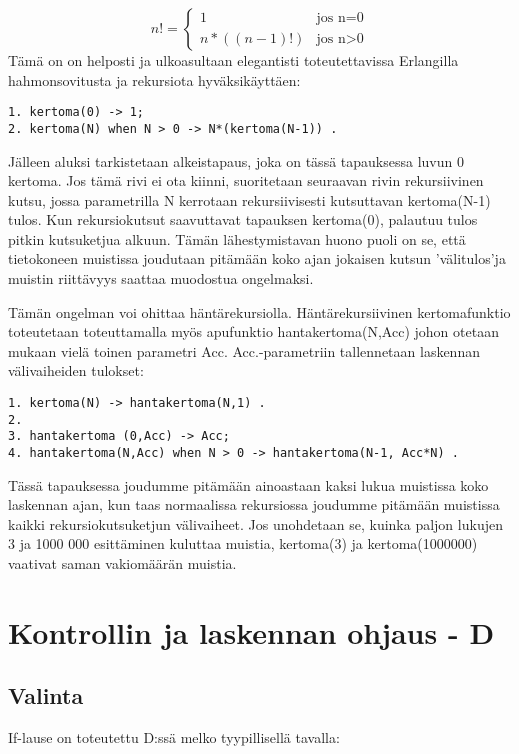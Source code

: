 \documentclass[11pt,oneside,a4paper]{article}
\begin{document}
\begin{displaymath}
n! = \left\{ \begin{array}{ll}
1 & \textrm{jos n=0}\\
n*((n-1)!) & \textrm{{jos n>0}}
\end{array} \right.
\end{displaymath}
Tämä on on helposti ja ulkoasultaan elegantisti toteutettavissa Erlangilla
hahmonsovitusta ja rekursiota hyväksikäyttäen:
\begin{verbatim}
1. kertoma(0) -> 1;
2. kertoma(N) when N > 0 -> N*(kertoma(N-1)) .
\end{verbatim}
Jälleen aluksi tarkistetaan alkeistapaus, joka on tässä tapauksessa luvun 0
kertoma. Jos tämä rivi ei ota kiinni, suoritetaan seuraavan rivin
rekursiivinen kutsu, jossa parametrilla N kerrotaan rekursiivisesti kutsuttavan
kertoma(N-1) tulos.
Kun rekursiokutsut saavuttavat tapauksen kertoma(0), palautuu tulos pitkin
kutsuketjua alkuun. Tämän lähestymistavan huono puoli on se, että tietokoneen
muistissa joudutaan pitämään koko ajan jokaisen kutsun 'välitulos'ja muistin
riittävyys saattaa muodostua ongelmaksi. 

Tämän ongelman voi ohittaa häntärekursiolla. Häntärekursiivinen kertomafunktio
toteutetaan toteuttamalla myös apufunktio hantakertoma(N,Acc) johon otetaan
mukaan vielä toinen parametri Acc. Acc.-parametriin tallennetaan laskennan 
välivaiheiden tulokset:
\begin{verbatim}
1. kertoma(N) -> hantakertoma(N,1) .
2.
3. hantakertoma (0,Acc) -> Acc;
4. hantakertoma(N,Acc) when N > 0 -> hantakertoma(N-1, Acc*N) .
\end{verbatim}
Tässä tapauksessa joudumme pitämään ainoastaan kaksi lukua muistissa koko
laskennan ajan, kun taas normaalissa rekursiossa joudumme pitämään muistissa kaikki
rekursiokutsuketjun välivaiheet. Jos unohdetaan se, kuinka paljon
lukujen 3 ja 1000 000 esittäminen kuluttaa muistia, kertoma(3) ja kertoma(1000000)
vaativat saman vakiomäärän muistia. 

\section{Kontrollin ja laskennan ohjaus - D}

\subsection{Valinta}

If-lause on toteutettu D:ssä melko tyypillisellä tavalla:
\end{document}
